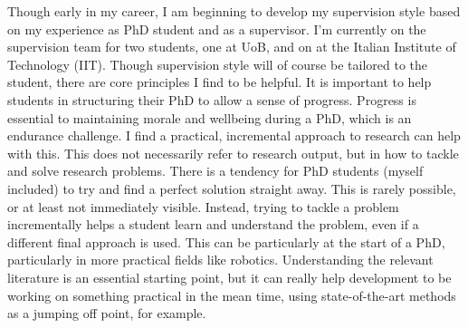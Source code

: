 \documentclass[12pt]{article}
\begin{document}
Though early in my career, I am beginning to develop my supervision style based on my experience as PhD student and as a supervisor.
%
I'm currently on the supervision team for two students, one at UoB, and on at the Italian Institute of Technology (IIT).
%
Though supervision style will of course be tailored to the student, there are core principles I find to be helpful.
%
It is important to help students in structuring their PhD to allow a sense of progress.
%
Progress is essential to maintaining morale and wellbeing during a PhD, which is an endurance challenge.
%
I find a practical, incremental approach to research can help with this.
%
This does not necessarily refer to research output, but in how to tackle and solve research problems.
%
There is a tendency for PhD students (myself included) to try and find a perfect solution straight away.
%
This is rarely possible, or at least not immediately visible.
%
Instead, trying to tackle a problem incrementally helps a student learn and understand the problem, even if a different final approach is used.
%
This can be particularly at the start of a PhD, particularly in more practical fields like robotics.
%
Understanding the relevant literature is an essential starting point, but it can really help development to be working on something practical in the mean time, using state-of-the-art methods as a jumping off point, for example.
\end{document}

